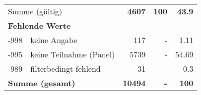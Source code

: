 \begin{longtable}{lXrrr}
     \midrule
     \multicolumn{2}{l}{Summe (gültig)} &
       \textbf{\num{4607}} &
     \textbf{\num{100}} &
       \textbf{\num[round-mode=places,round-precision=2]{43.9}} \\
     \multicolumn{5}{l}{\textbf{Fehlende Werte}}\\
       -998 &
       keine Angabe &
         \num{117} &
        - &
         \num[round-mode=places,round-precision=2]{1.11} \\
       -995 &
       keine Teilnahme (Panel) &
         \num{5739} &
        - &
         \num[round-mode=places,round-precision=2]{54.69} \\
       -989 &
       filterbedingt fehlend &
         \num{31} &
        - &
         \num[round-mode=places,round-precision=2]{0.3} \\
     \midrule
     \multicolumn{2}{l}{\textbf{Summe (gesamt)}} &
          \textbf{\num{10494}} &
        \textbf{-} &
        \textbf{\num{100}} \\
     \bottomrule
     \end{longtable}
     
